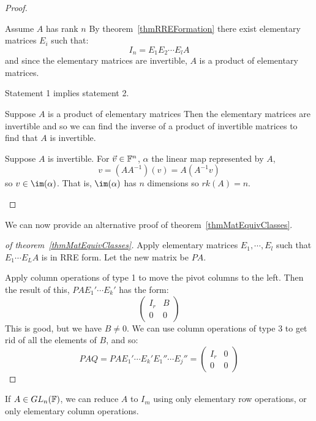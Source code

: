 \documentclass[../Main.tex]{subfiles}
\begin{document}
\begin{proof}
    \begin{subproof}{Assume $A$ has rank $n$}
        By theorem~\ref{thmRREFormation} there exist elementary matrices $E_i$ such that:
        \begin{equation*}
            I_n = E_1 E_2 \cdots E_l A
        \end{equation*}
        and since the elementary matrices are invertible, $A$ is a product of elementary matrices.

        Statement 1 implies statement 2.
    \end{subproof}
    \begin{subproof}{Suppose $A$ is a product of elementary matrices}
        Then the elementary matrices are invertible and so we can find the inverse of a product of invertible matrices to find that $A$ is invertible.
    \end{subproof}
    \begin{subproof}{Suppose $A$ is invertible.}
        For $\vec{v} \in \mathbb{F}^n$, $\alpha$ the linear map represented by $A$,
        \begin{equation*}
            v = (AA^{-1})(v) = A(A^{-1}v)
        \end{equation*}
        so $v \in \im(\alpha)$. That is, $\im(\alpha)$ has $n$ dimensions so $rk(A) = n$.
    \end{subproof}
\end{proof}
We can now provide an alternative proof of theorem~\ref{thmMatEquivClasses}.
\begin{proof}[of theorem~\ref{thmMatEquivClasses}]
    Apply elementary matrices $E_1, \cdots, E_l$ such that $E_1 \cdots E_L A$ is in RRE form. Let the new matrix be $PA$.

    Apply column operations of type 1 to move the pivot columns to the left. Then the result of this, $PAE_1' \cdots E_k'$ has the form:
    \begin{equation*}
        \begin{pmatrix}
            I_r & B \\
            0 & 0
        \end{pmatrix}
    \end{equation*}
    This is good, but we have $B \neq 0$. We can use column operations of type 3 to get rid of all the elements of $B$, and so:
    \begin{equation*}
        PAQ = PAE_1' \cdots E_k' E_1'' \cdots E_j'' =
        \begin{pmatrix}
            I_r & 0 \\
            0 & 0
        \end{pmatrix}
    \end{equation*}
\end{proof}
\begin{remark}
    If $A \in GL_n(\mathbb{F})$, we can reduce $A$ to $I_m$ using only elementary row operations, or only elementary column operations.
\end{remark}
\end{document}
